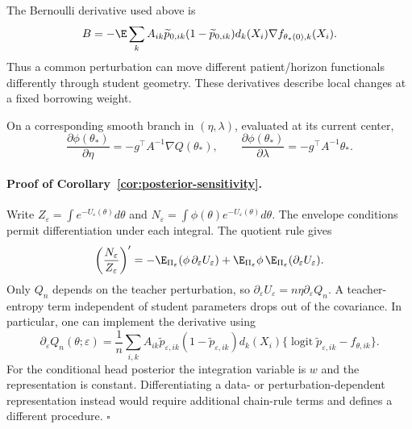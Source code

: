 \documentclass{article} %
\DeclareMathOperator{\logit}{logit}
\begin{document}
The Bernoulli derivative used above is
\begin{equation}
B=-\E\sum_kA_{ik}\widetilde p_{0,ik}(1-\widetilde p_{0,ik})d_k(X_i)
\nabla f_{\theta_*(0),k}(X_i).
\label{eq:teacher-direction-score}
\end{equation}
Thus a common perturbation can move different patient/horizon functionals differently through student geometry. These derivatives describe local changes at a fixed borrowing weight.

On a corresponding smooth branch in $(\eta,\lambda)$, evaluated at its current center,
\begin{equation}
\frac{\partial\phi(\theta_*)}{\partial\eta}=-g^\top A^{-1}\nabla Q(\theta_*),
\qquad
\frac{\partial\phi(\theta_*)}{\partial\lambda}=-g^\top A^{-1}\theta_*.
\label{eq:hyperparameter-sensitivity}
\end{equation}

\paragraph{Proof of Corollary~\ref{cor:posterior-sensitivity}.}
Write $Z_\varepsilon=\int e^{-U_\varepsilon(\theta)}d\theta$ and $N_\varepsilon=\int\phi(\theta)e^{-U_\varepsilon(\theta)}d\theta$. The envelope conditions permit differentiation under each integral. The quotient rule gives
\[
\left(\frac{N_\varepsilon}{Z_\varepsilon}\right)'
=-\E_{\Pi_\varepsilon}(\phi\,\partial_\varepsilon U_\varepsilon)
+\E_{\Pi_\varepsilon}\phi\,\E_{\Pi_\varepsilon}(\partial_\varepsilon U_\varepsilon).
\]
Only $Q_n$ depends on the teacher perturbation, so $\partial_\varepsilon U_\varepsilon=n\eta\partial_\varepsilon Q_n$. A teacher-entropy term independent of student parameters drops out of the covariance. In particular, one can implement the derivative using
\[
\partial_\varepsilon Q_n(\theta;\varepsilon)
=\frac1n\sum_{i,k}A_{ik}\widetilde p_{\varepsilon,ik}(1-\widetilde p_{\varepsilon,ik})d_k(X_i)
\{\logit\widetilde p_{\varepsilon,ik}-f_{\theta,ik}\}.
\]
For the conditional head posterior the integration variable is $w$ and the representation is constant. Differentiating a data- or perturbation-dependent representation instead would require additional chain-rule terms and defines a different procedure. \hfill$\square$
\end{document}
